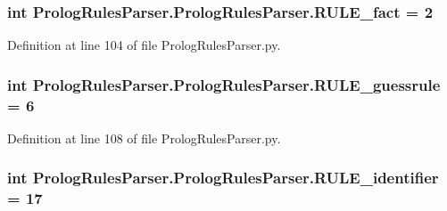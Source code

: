 \subsubsection[{R\+U\+L\+E\+\_\+fact}]{\setlength{\rightskip}{0pt plus 5cm}int Prolog\+Rules\+Parser.\+Prolog\+Rules\+Parser.\+R\+U\+L\+E\+\_\+fact = 2\hspace{0.3cm}{\ttfamily [static]}}\label{class_prolog_rules_parser_1_1_prolog_rules_parser_aba168460a11bb4fed7b3cb91a919c423}


Definition at line 104 of file Prolog\+Rules\+Parser.\+py.

\hypertarget{class_prolog_rules_parser_1_1_prolog_rules_parser_a4d8b7576258fb1f854c4d1d0d8889243}{}
\subsubsection[{R\+U\+L\+E\+\_\+guessrule}]{\setlength{\rightskip}{0pt plus 5cm}int Prolog\+Rules\+Parser.\+Prolog\+Rules\+Parser.\+R\+U\+L\+E\+\_\+guessrule = 6\hspace{0.3cm}{\ttfamily [static]}}\label{class_prolog_rules_parser_1_1_prolog_rules_parser_a4d8b7576258fb1f854c4d1d0d8889243}


Definition at line 108 of file Prolog\+Rules\+Parser.\+py.

\hypertarget{class_prolog_rules_parser_1_1_prolog_rules_parser_a835070742e48135fee80dcece6bc2902}{}
\subsubsection[{R\+U\+L\+E\+\_\+identifier}]{\setlength{\rightskip}{0pt plus 5cm}int Prolog\+Rules\+Parser.\+Prolog\+Rules\+Parser.\+R\+U\+L\+E\+\_\+identifier = 17\hspace{0.3cm}{\ttfamily [static]}}\label{class_prolog_rules_parser_1_1_prolog_rules_parser_a835070742e48135fee80dcece6bc2902}


